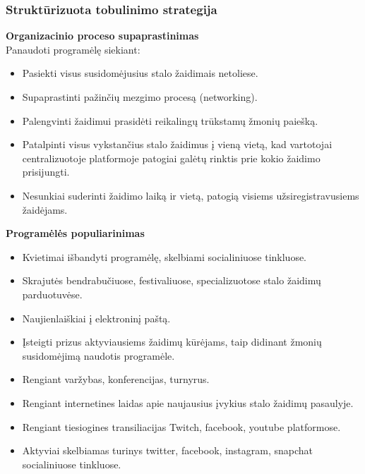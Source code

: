 \documentclass{VUMIFPSkursinis}
\begin{document}
		\subsubsection{Struktūrizuota tobulinimo strategija}
			\textbf{Organizacinio proceso supaprastinimas}\\
			Panaudoti programėlę siekiant:
			\renewcommand{\labelitemi}{$\bullet$}
				\begin{itemize}
					\item Pasiekti visus susidomėjusius stalo žaidimais netoliese.
					\item Supaprastinti pažinčių mezgimo procesą (networking).
					\item Palengvinti žaidimui prasidėti reikalingų trūkstamų žmonių paiešką.
					\item Patalpinti visus vykstančius stalo žaidimus į vieną vietą, kad vartotojai centralizuotoje platformoje patogiai galėtų rinktis prie kokio žaidimo prisijungti.
					\item Nesunkiai suderinti žaidimo laiką ir vietą, patogią visiems užsiregistravusiems žaidėjams.
				\end{itemize}	

			\textbf{Programėlės populiarinimas}
			\renewcommand{\labelitemi}{$\bullet$}
				\begin{itemize}
					\item Kvietimai išbandyti programėlę, skelbiami socialiniuose tinkluose.
					\item Skrajutės bendrabučiuose, festivaliuose, specializuotose stalo žaidimų parduotuvėse.
					\item Naujienlaiškiai į elektroninį paštą.
					\item Įsteigti prizus aktyviausiems žaidimų kūrėjams, taip didinant žmonių susidomėjimą naudotis programėle.
					\item Rengiant varžybas, konferencijas, turnyrus.
					\item Rengiant internetines laidas apie naujausius įvykius stalo žaidimų pasaulyje.
					\item Rengiant tiesiogines transiliacijas Twitch, facebook, youtube platformose.
					\item Aktyviai skelbiamas turinys twitter, facebook, instagram, snapchat socialiniuose tinkluose.
				\end{itemize}
				
\end{document}
